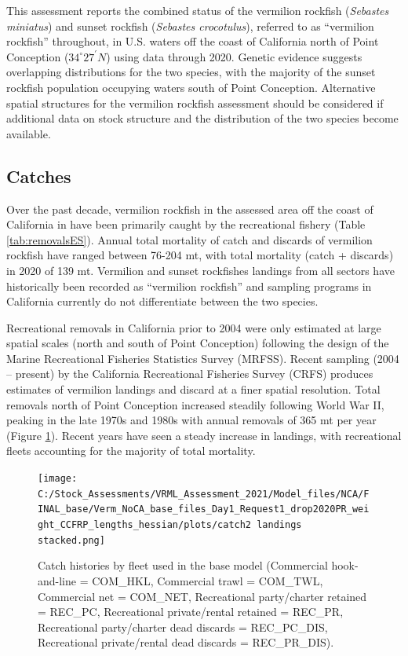 \documentclass[
  english,
  a4paper,
]{article}
\begin{document}
This assessment reports the combined status of the vermilion rockfish (\emph{Sebastes miniatus}) and sunset rockfish (\emph{Sebastes crocotulus}), referred to as ``vermilion rockfish'' throughout, in U.S. waters off the coast of California north
of Point Conception ($34^\circ 27^\prime N$) using data through 2020. Genetic evidence suggests
overlapping distributions for the two species, with the majority of the sunset rockfish population occupying waters south of Point Conception. Alternative spatial structures for the vermilion rockfish assessment should be considered if additional data on stock structure and the distribution of the two species become available.

\hypertarget{catches}{%
\subsection*{Catches}\label{catches}}

Over the past decade, vermilion rockfish in the assessed area off the coast of
California in have been
primarily caught by the recreational fishery (Table \ref{tab:removalsES}).
Annual total mortality of catch and discards of vermilion rockfish have ranged between
76-204
mt, with total mortality (catch + discards) in 2020 of 139 mt.
Vermilion and sunset rockfishes landings from all sectors have historically been recorded as
``vermilion rockfish'' and sampling programs in California currently do not
differentiate between the two species.

Recreational removals in California prior to 2004 were only estimated at large
spatial scales (north and south of Point Conception) following the design of
the Marine Recreational Fisheries Statistics Survey (MRFSS). Recent sampling
(2004 -- present) by the California Recreational Fisheries Survey (CRFS) produces
estimates of vermilion landings and discard at a finer spatial resolution. Total
removals north of Point Conception increased steadily following World
War II, peaking in the late 1970s and 1980s with annual removals of
365 mt per year (Figure \ref{fig:catchES}). Recent
years have seen a steady increase in landings, with recreational fleets accounting
for the majority of total mortality.

\FloatBarrier

\begin{figure}
\centering
\texttt{[image: C:/Stock\_Assessments/VRML\_Assessment\_2021/Model\_files/NCA/FINAL\_base/Verm\_NoCA\_base\_files\_Day1\_Request1\_drop2020PR\_weight\_CCFRP\_lengths\_hessian/plots/catch2 landings stacked.png]}
\caption{Catch histories by fleet used in the base model
(Commercial hook-and-line = COM\_HKL,
Commercial trawl = COM\_TWL, Commercial net = COM\_NET,
Recreational party/charter retained = REC\_PC, Recreational
private/rental retained = REC\_PR, Recreational party/charter
dead discards = REC\_PC\_DIS, Recreational private/rental dead
discards = REC\_PR\_DIS).\label{fig:catchES}}
\end{figure}
\end{document}
